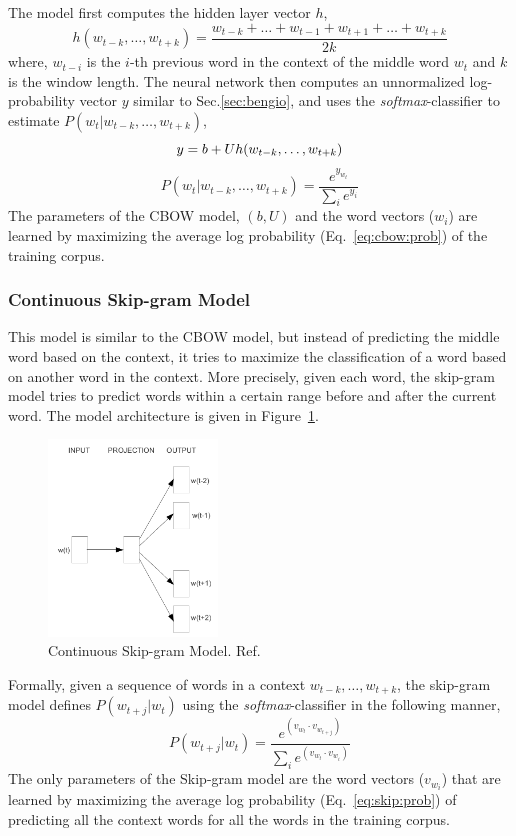 The model first computes the hidden layer vector $h$, 
\begin{equation}
h(w_{t-k}, \ldots, w_{t+k}) = \frac{w_{t-k} + \ldots + w_{t-1} + w_{t+1} + \dots + w_{t+k}}{2k}
\end{equation}
where, $w_{t-i}$ is the $i$-th previous word in the context of the middle word $w_{t}$ and $k$ is the window length.
The neural network then computes an unnormalized log-probability vector $y$ similar to Sec.\ref{sec:bengio}, and uses the \emph{softmax}-classifier to estimate $P(w_{t}|w_{t-k}, \ldots, w_{t+k})$,
\begin{equation}
y = b + Uh(w_{t-k}, \ldots, w_{t+k})\\
\end{equation}
\begin{equation}
\label{eq:cbow:prob}
P(w_{t}|w_{t-k}, \ldots, w_{t+k}) = \frac{e^{y_{w_t}}}{\sum_{i} e^{y_{i}}}
\end{equation}
The parameters of the CBOW model, $(b, U)$ and the word vectors ($w_{i}$) are learned by maximizing the average log probability (Eq.~\ref{eq:cbow:prob}) of the training corpus.

\subsubsection{Continuous Skip-gram Model}
This model is similar to the CBOW model, but instead of predicting the middle word based on the context, it tries to maximize the classification of a word based on another word in the context. More precisely, given each word, the skip-gram model tries to predict words within a certain range before and after the current word. The model architecture is given in Figure~\ref{fig:nn:skip}.
\begin{figure}[h!]
    \centering
        \includegraphics[width=0.4\textwidth]{figs/mikolov_skip.png}
    \caption{Continuous Skip-gram Model. Ref. \cite{mikolov2013efficient}}
    \label{fig:nn:skip}
\end{figure}
Formally, given a sequence of words in a context $w_{t-k}, \ldots, w_{t+k}$, the skip-gram model defines $P(w_{t+j}|w_{t})$ using the \emph{softmax}-classifier in the following manner,
\begin{equation}
\label{eq:skip:prob}
P(w_{t+j}|w_{t}) = \frac{e^{(v_{w_{t}} \cdot v_{w_{t+j}} )} }{\sum_{i} e^{(v_{w_{t}} \cdot v_{w_{i}})} }
\end{equation}
The only parameters of the Skip-gram model are the word vectors ($v_{w_{i}}$) that are learned by maximizing the average log probability (Eq.~\ref{eq:skip:prob}) of predicting all the context words for all the words in the training corpus.

